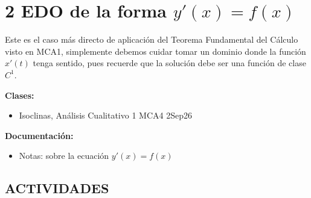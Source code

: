 \section{2 EDO de la forma $y'(x)=f(x)$}

\begin{tcolorbox}[enunciado]
Este es el caso más directo de aplicación del Teorema Fundamental del Cálculo visto en MCA1, simplemente debemos cuidar tomar un dominio donde la función $x'(t)$ tenga sentido, pues recuerde que la solución debe ser una función de clase $C^{1}$.

\vspace{0.2cm}
\textbf{Clases:}
\begin{itemize}[leftmargin=*]
    \item Isoclinas, Análisis Cualitativo 1 MCA4 2Sep26
\end{itemize}

\textbf{Documentación:}
\begin{itemize}[leftmargin=*]
    \item Notas: sobre la ecuación $y'(x)=f(x)$
\end{itemize}
\end{tcolorbox}

\subsection*{ACTIVIDADES}

